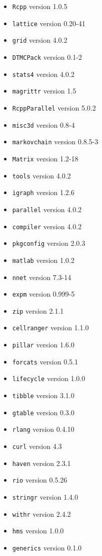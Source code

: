 \documentclass[11pt]{paper}
\begin{document}
\begin{itemize}

\item \texttt{Rcpp} version 1.0.5
\item \texttt{lattice} version 0.20-41
\item \texttt{grid} version 4.0.2
\item \texttt{DTMCPack} version 0.1-2
\item \texttt{stats4} version 4.0.2
\item \texttt{magrittr} version 1.5
\item \texttt{RcppParallel} version 5.0.2
\item \texttt{misc3d} version 0.8-4
\item \texttt{markovchain} version 0.8.5-3
\item \texttt{Matrix} version 1.2-18
\item \texttt{tools} version 4.0.2
\item \texttt{igraph} version 1.2.6
\item \texttt{parallel} version 4.0.2
\item \texttt{compiler} version 4.0.2
\item \texttt{pkgconfig} version 2.0.3
\item \texttt{matlab} version 1.0.2
\item \texttt{nnet} version 7.3-14
\item \texttt{expm} version 0.999-5  
\item \texttt{zip} version 2.1.1
\item \texttt{cellranger} version 1.1.0
\item \texttt{pillar} version 1.6.0
\item \texttt{forcats} version 0.5.1
\item \texttt{lifecycle} version 1.0.0
\item \texttt{tibble} version 3.1.0
\item \texttt{gtable} version 0.3.0
\item \texttt{rlang} version 0.4.10
\item \texttt{curl} version 4.3
\item \texttt{haven} version 2.3.1
\item \texttt{rio} version 0.5.26
\item \texttt{stringr} version 1.4.0
\item \texttt{withr} version 2.4.2       
\item \texttt{hms} version 1.0.0        
\item \texttt{generics} version 0.1.0    

\end{itemize}
\end{document}
